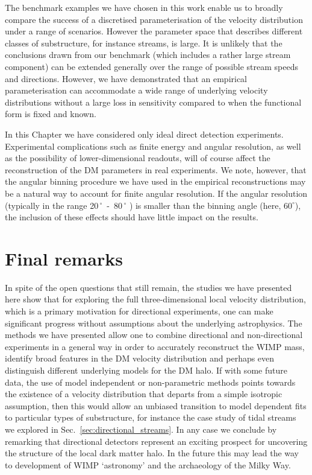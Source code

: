 The benchmark examples we have chosen in this work enable us to broadly compare the success of a discretised parameterisation of the velocity distribution under a range of scenarios. However the parameter space that describes different classes of substructure, for instance streams, is large. It is unlikely that the conclusions drawn from our benchmark (which includes a rather large stream component) can be extended generally over the range of possible stream speeds and directions. However, we have demonstrated that an empirical parameterisation can accommodate a wide range of underlying velocity distributions without a large loss in sensitivity compared to when the functional form is fixed and known.

In this Chapter we have considered only ideal direct detection experiments. Experimental complications such as finite energy and angular resolution, as well as the possibility of lower-dimensional readouts, will of course affect the reconstruction of the DM parameters in real experiments. We note, however, that the angular binning procedure we have used in the empirical reconstructions may be a natural way to account for finite angular resolution. If the angular resolution (typically in the range 20$\,^{\circ}$~-~80$\,^{\circ}$ \cite{Billard:2012bk}) is smaller than the binning angle (here, $60^\circ$), the inclusion of these effects should have little impact on the results.

\section{Final remarks}\label{sec:directional_finalremarks}
In spite of the open questions that still remain, the studies we have presented here show that for exploring the full three-dimensional local velocity distribution, which is a primary motivation for directional experiments, one can make significant progress without assumptions about the underlying astrophysics. The methods we have presented allow one to combine directional and non-directional experiments in a general way in order to accurately reconstruct the WIMP mass, identify broad features in the DM velocity distribution and perhaps even distinguish different underlying models for the DM halo. If with some future data, the use of model independent or non-parametric methods points towards the existence of a velocity distribution that departs from a simple isotropic assumption, then this would allow an unbiased transition to model dependent fits to particular types of substructure, for instance the case study of tidal streams we explored in Sec.~\ref{sec:directional_streams}. In any case we conclude by remarking that directional detectors represent an exciting prospect for uncovering the structure of the local dark matter halo. In the future this may lead the way to development of WIMP `astronomy' and the archaeology of the Milky Way.